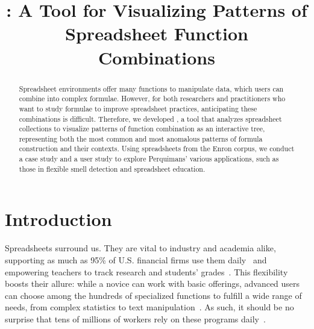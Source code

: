 \documentclass[conference]{IEEEtran}
\newcommand{\toolnameposs}{Perquimans' }
\begin{document}
 \title{\toolnameend: A Tool for Visualizing Patterns of
		Spreadsheet Function Combinations}
	
	
	\author{ 
		}
	
	
	\maketitle
	
	\begin{abstract} Spreadsheet environments offer many
		functions to manipulate data, which users can combine into
		complex formulae. However, for both researchers and practitioners who want to
		study formulae to improve spreadsheet practices, anticipating these
		combinations is difficult. Therefore, we developed \toolnameend, a tool that
		analyzes spreadsheet collections to visualize patterns of function combination
		as an interactive tree, representing both the most common and most anomalous
		patterns of formula construction and their contexts. Using spreadsheets from
		the Enron corpus, we conduct a case study and a user study to explore
		\toolnameposs various applications, such as those in flexible smell
		detection and spreadsheet education.
		
	\end{abstract}
	
	\section{Introduction} Spreadsheets surround us. They are vital to
	industry and academia alike, supporting as much as 95\% of U.S. financial firms
	use them daily~\cite{panko2008sarbanes} and empowering teachers to track
	research and students' grades~\cite{ko2011state}. This flexibility boosts their
	allure: while a novice can work with basic offerings, advanced users can choose
	among the hundreds of specialized functions to fulfill a wide range of needs,
	from complex statistics to text manipulation~\cite{nardi1990spreadsheet}. As
	such, it should be no surprise that tens of millions of workers rely on these
	programs daily~\cite{scaffidi2005estimating}.
	
\end{document}
